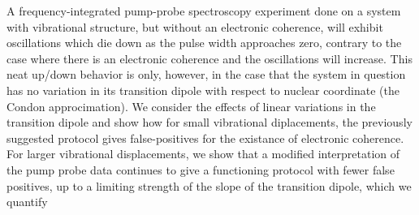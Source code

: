 A frequency-integrated pump-probe spectroscopy experiment done on a system with vibrational structure, but without an electronic coherence, will exhibit oscillations which die down as the pulse width approaches zero, contrary to the case where there is an electronic coherence and the oscillations will increase.  This neat up/down behavior is only, however, in the case that the system in question has no variation in its transition dipole with respect to nuclear coordinate (the Condon approcimation).  We consider the effects of linear variations in the transition dipole and show how for small vibrational diplacements, the previously suggested protocol gives false-positives for the existance of electronic coherence.  For larger vibrational displacements, we show that a modified interpretation of the pump probe data continues to give a functioning protocol with fewer false positives, up to a limiting strength of the slope of the transition dipole, which we quantify
